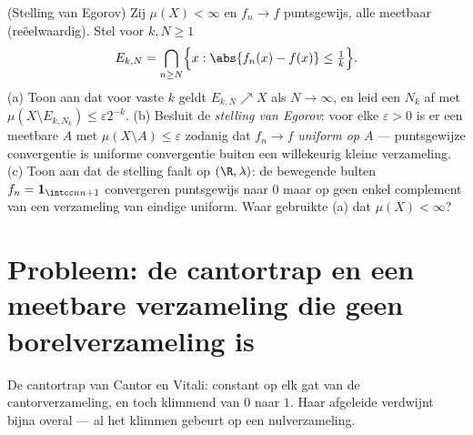 \begin{exercise}[$\star\star\star$]\label{exo:b3:measure:12}
(Stelling van Egorov) Zij $\mu(X) < \infty$ en $f_n \to f$
puntsgewijs, alle meetbaar (reëelwaardig). Stel voor $k, N \geq 1$
\[
E_{k,N} = \bigcap_{n \geq N}\Bigl\{x : \abs{f_n(x) - f(x)}
\leq \tfrac1k\Bigr\} .
\]
(a) Toon aan dat voor vaste $k$ geldt $E_{k,N} \nearrow X$ als $N
\to \infty$, en leid een $N_k$ af met $\mu(X \setminus E_{k,N_k})
\leq \varepsilon2^{-k}$.
(b) Besluit de \emph{stelling van Egorov}: voor elke $\varepsilon
> 0$ is er een meetbare $A$ met $\mu(X\setminus A) \leq
\varepsilon$ zodanig dat $f_n \to f$ \emph{uniform op $A$} ---
puntsgewijze convergentie is uniforme convergentie buiten een
willekeurig kleine verzameling.
(c) Toon aan dat de stelling faalt op $(\R, \lambda)$: de
bewegende bulten $f_n = \mathbf 1_{\intcc n{n+1}}$ convergeren
puntsgewijs naar $0$ maar op geen enkel complement van een
verzameling van eindige  uniform. Waar gebruikte (a) dat
$\mu(X) < \infty$?
\end{exercise}

\section{Probleem: de cantortrap en een meetbare verzameling die
geen borelverzameling is}

\begin{omfigure}

{\small De cantortrap van Cantor en Vitali: constant op elk gat
van de cantorverzameling, en toch  klimmend van $0$ naar
$1$. Haar afgeleide verdwijnt bijna overal --- al het klimmen
gebeurt op een nulverzameling.}
\end{omfigure}

